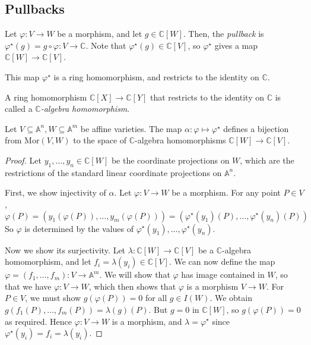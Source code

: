 \subsection{Pullbacks}
\begin{definition}
    Let \( \varphi \colon V \to W \) be a morphism, and let \( g \in \mathbb C[W] \).
    Then, the \emph{pullback} is \( \varphi^\star(g) = g \circ \varphi \colon V \to \mathbb C \).
    Note that \( \varphi^\star(g) \in \mathbb C[V] \), so \( \varphi^\star \) gives a map \( \mathbb C[W] \to \mathbb C[V] \).
\end{definition}
\begin{remark}
    This map \( \varphi^\star \) is a ring homomorphism, and restricts to the identity on \( \mathbb C \).
\end{remark}
\begin{definition}
    A ring homomorphism \( \mathbb C[X] \to \mathbb C[Y] \) that restricts to the identity on \( \mathbb C \) is called a \emph{\( \mathbb C \)-algebra homomorphism}.
\end{definition}
\begin{theorem}
    Let \( V \subseteq \mathbb A^n, W \subseteq \mathbb A^m \) be affine varieties.
    The map \( \alpha \colon \varphi \mapsto \varphi^\star \) defines a bijection from \( \mathrm{Mor}(V, W) \) to the space of \( \mathbb C \)-algebra homomorphisms \( \mathbb C[W] \to \mathbb C[V] \).
\end{theorem}
\begin{proof}
    Let \( y_1, \dots, y_n \in \mathbb C[W] \) be the coordinate projections on \( W \), which are the restrictions of the standard linear coordinate projections on \( \mathbb A^n \).

    First, we show injectivity of \( \alpha \).
    Let \( \varphi \colon V \to W \) be a morphism.
    For any point \( P \in V \),
    \[ \varphi(P) = (y_1(\varphi(P)), \dots, y_m(\varphi(P))) = (\varphi^\star(y_1)(P), \dots, \varphi^\star(y_n)(P)) \]
    So \( \varphi \) is determined by the values of \( \varphi^\star(y_1), \dots, \varphi^\star(y_n) \).

    Now we show its surjectivity.
    Let \( \lambda \colon \mathbb C[W] \to \mathbb C[V] \) be a \( \mathbb C \)-algebra homomorphism, and let \( f_i = \lambda(y_i) \in \mathbb C[V] \).
    We can now define the map \( \varphi = (f_1, \dots, f_m) \colon V \to \mathbb A^m \).
    We will show that \( \varphi \) has image contained in \( W \), so that we have \( \varphi \colon V \to W \), which then shows that \( \varphi \) is a morphism \( V \to W \).
    For \( P \in V \), we must show \( g(\varphi(P)) = 0 \) for all \( g \in I(W) \).
    We obtain \( g(f_1(P), \dots, f_m(P)) = \lambda(g)(P) \).
    But \( g = 0 \) in \( \mathbb C[W] \), so \( g(\varphi(P)) = 0 \) as required.
    Hence \( \varphi \colon V \to W \) is a morphism, and \( \lambda = \varphi^\star \) since \( \varphi^\star(y_i) = f_i = \lambda(y_i) \).
\end{proof}
